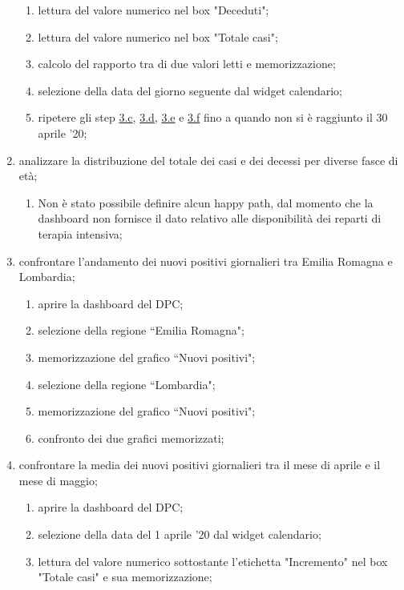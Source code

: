 \begin{enumerate}
\begin{enumerate}[label=\alph*.]
        \item lettura del valore numerico nel box "Deceduti"; \label{taa:c}
        \item lettura del valore numerico nel box "Totale casi"; \label{taa:d}
        \item calcolo del rapporto tra di due valori letti e memorizzazione; \label{taa:e}
        \item selezione della data del giorno seguente dal widget calendario; \label{taa:f}
        \item ripetere gli step \hyperref[taa:c]{3.c}, \hyperref[taa:d]{3.d}, \hyperref[taa:e]{3.e} e \hyperref[taa:f]{3.f} fino a quando non si è raggiunto il 30 aprile '20;
    \end{enumerate}
    \item analizzare la distribuzione del totale dei casi e dei decessi per diverse fasce di età;
    \begin{enumerate}[label=\alph*.]
        \item  Non è stato possibile definire alcun happy path, dal momento che la dashboard non fornisce il dato relativo alle disponibilità dei reparti di terapia intensiva;
    \end{enumerate}
    \item confrontare l'andamento dei nuovi positivi giornalieri tra Emilia Romagna e Lombardia;
    \begin{enumerate}[label=\alph*.]
        \item aprire la dashboard del DPC;
        \item selezione della regione ``Emilia Romagna";
        \item memorizzazione del grafico ``Nuovi positivi";
        \item selezione della regione ``Lombardia";
        \item memorizzazione del grafico ``Nuovi positivi";
        \item confronto dei due grafici memorizzati;
    \end{enumerate}
    \item confrontare la media dei nuovi positivi giornalieri tra il mese di aprile e il mese di maggio;
    \begin{enumerate}[label=\alph*.]
        \item aprire la dashboard del DPC;
        \item selezione della data del 1 aprile '20 dal widget calendario; \label{at:b}
        \item lettura del valore numerico sottostante l'etichetta "Incremento" nel box "Totale casi" e sua memorizzazione; \label{at:c}

\end{enumerate}
\end{enumerate}
